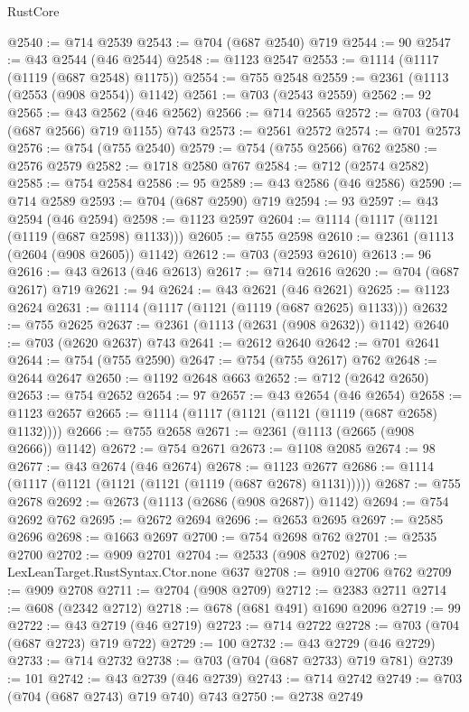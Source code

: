 \begin{lexlean}{RustCore}
\begin{coremodule}
@2540 := @714 @2539
@2543 := @704 (@687 @2540) @719
@2544 := 90
@2547 := @43 @2544 (@46 @2544)
@2548 := @1123 @2547
@2553 := @1114 (@1117 (@1119 (@687 @2548) @1175))
@2554 := @755 @2548
@2559 := @2361 (@1113 (@2553 (@908 @2554)) @1142)
@2561 := @703 (@2543 @2559)
@2562 := 92
@2565 := @43 @2562 (@46 @2562)
@2566 := @714 @2565
@2572 := @703 (@704 (@687 @2566) @719 @1155) @743
@2573 := @2561 @2572
@2574 := @701 @2573
@2576 := @754 (@755 @2540)
@2579 := @754 (@755 @2566) @762
@2580 := @2576 @2579
@2582 := @1718 @2580 @767
@2584 := @712 (@2574 @2582)
@2585 := @754 @2584
@2586 := 95
@2589 := @43 @2586 (@46 @2586)
@2590 := @714 @2589
@2593 := @704 (@687 @2590) @719
@2594 := 93
@2597 := @43 @2594 (@46 @2594)
@2598 := @1123 @2597
@2604 := @1114 (@1117 (@1121 (@1119 (@687 @2598) @1133)))
@2605 := @755 @2598
@2610 := @2361 (@1113 (@2604 (@908 @2605)) @1142)
@2612 := @703 (@2593 @2610)
@2613 := 96
@2616 := @43 @2613 (@46 @2613)
@2617 := @714 @2616
@2620 := @704 (@687 @2617) @719
@2621 := 94
@2624 := @43 @2621 (@46 @2621)
@2625 := @1123 @2624
@2631 := @1114 (@1117 (@1121 (@1119 (@687 @2625) @1133)))
@2632 := @755 @2625
@2637 := @2361 (@1113 (@2631 (@908 @2632)) @1142)
@2640 := @703 (@2620 @2637) @743
@2641 := @2612 @2640
@2642 := @701 @2641
@2644 := @754 (@755 @2590)
@2647 := @754 (@755 @2617) @762
@2648 := @2644 @2647
@2650 := @1192 @2648 @663
@2652 := @712 (@2642 @2650)
@2653 := @754 @2652
@2654 := 97
@2657 := @43 @2654 (@46 @2654)
@2658 := @1123 @2657
@2665 := @1114 (@1117 (@1121 (@1121 (@1119 (@687 @2658) @1132))))
@2666 := @755 @2658
@2671 := @2361 (@1113 (@2665 (@908 @2666)) @1142)
@2672 := @754 @2671
@2673 := @1108 @2085
@2674 := 98
@2677 := @43 @2674 (@46 @2674)
@2678 := @1123 @2677
@2686 := @1114 (@1117 (@1121 (@1121 (@1121 (@1119 (@687 @2678) @1131)))))
@2687 := @755 @2678
@2692 := @2673 (@1113 (@2686 (@908 @2687)) @1142)
@2694 := @754 @2692 @762
@2695 := @2672 @2694
@2696 := @2653 @2695
@2697 := @2585 @2696
@2698 := @1663 @2697
@2700 := @754 @2698 @762
@2701 := @2535 @2700
@2702 := @909 @2701
@2704 := @2533 (@908 @2702)
@2706 := LexLeanTarget.RustSyntax.Ctor.none @637
@2708 := @910 @2706 @762
@2709 := @909 @2708
@2711 := @2704 (@908 @2709)
@2712 := @2383 @2711
@2714 := @608 (@2342 @2712)
@2718 := @678 (@681 @491) @1690 @2096
@2719 := 99
@2722 := @43 @2719 (@46 @2719)
@2723 := @714 @2722
@2728 := @703 (@704 (@687 @2723) @719 @722)
@2729 := 100
@2732 := @43 @2729 (@46 @2729)
@2733 := @714 @2732
@2738 := @703 (@704 (@687 @2733) @719 @781)
@2739 := 101
@2742 := @43 @2739 (@46 @2739)
@2743 := @714 @2742
@2749 := @703 (@704 (@687 @2743) @719 @740) @743
@2750 := @2738 @2749

\end{coremodule}
\end{lexlean}
